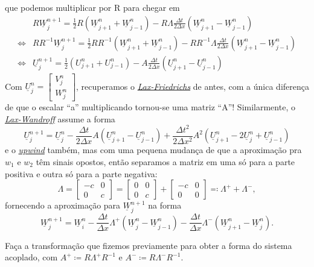 \documentclass[../differential_methods.tex]{subfiles}
\begin{document}
que podemos multiplicar por R para chegar em
\begin{align*}
	                    & R\underline{W}_{j}^{n+1} = \frac{1}{2}R(\underline{W}_{j+1}^{n}+\underline{W}_{j-1}^{n})-R\Lambda \frac{\Delta t}{2\Delta x}(\underline{W}_{j+1}^{n}-\underline{W}_{j-1}^{n})                   \\
	\Longleftrightarrow & RR^{-1}\underline{W}_{j}^{n+1} = \frac{1}{2}RR^{-1}(\underline{W}_{j+1}^{n}+\underline{W}_{j-1}^{n})-RR^{-1}\Lambda \frac{\Delta t}{2\Delta x}(\underline{W}_{j+1}^{n}-\underline{W}_{j-1}^{n}) \\
	\Longleftrightarrow & \boxed{\underline{U}_{j}^{n+1} = \frac{1}{2}(U_{j+1}^{n}+U_{j-1}^{n}) - A \frac{\Delta t}{2\Delta x}(\underline{U}_{j+1}^{n} - \underline{U}_{j-1}^{n})}
\end{align*}
Com \(\underline{U}_{j}^{n} = \begin{bmatrix}
	V_{j}^{n} \\
	W_{j}^{n}
\end{bmatrix}\), recuperamos o \hyperlink{lax_friedrichs}{\textit{Lax-Friedrichs}} de antes, com a única diferença de que o escalar ``a'' multiplicando tornou-se uma matriz ``A''! Similarmente, o \hyperlink{lax_wandroff}{\textit{Lax-Wandroff}} assume a forma
\[
	\boxed{\underline{U}_{j}^{n+1} = \underline{U}_{j}^{n} - \frac{\Delta t}{2\Delta x} A (\underline{U}_{j+1}^{n} - \underline{U}_{j-1}^{n}) + \frac{\Delta t^{2}}{2\Delta x^{2}} A^{2}(\underline{U}_{j+1}^{n}-2\underline{U}_{j}^{n}+\underline{U}_{j-1}^{n})}
\]
e o \hyperlink{up_wind}{\textit{upwind}} também, mas com uma pequena mudança de que a aproximação pra \(w_1\) e \(w_2\) têm sinais opostos, então separamos a matriz em uma só para a parte positiva e outra só para a parte negativa:
\[
	\Lambda  = \begin{bmatrix}
		-c & 0 \\
		0  & c
	\end{bmatrix} = \begin{bmatrix}
		0 & 0 \\
		0 & c
	\end{bmatrix} + \begin{bmatrix}
		-c & 0 \\
		0  & 0
	\end{bmatrix} \eqqcolon \Lambda^{+} + \Lambda^{-},
\]
fornecendo a aproximação para \(\underline{W}_{j}^{n+1}\) na forma
\[
	\underline{W}_{j}^{n+1} = \underline{W}_{i}^{n} - \frac{\Delta t}{\Delta x}\Lambda^{+}(\underline{W}_{j}^{n} - \underline{W}_{j-1}^{n}) - \frac{\Delta t}{\Delta x}\Lambda^{-}(\underline{W}_{j+1}^{n} - \underline{W}_{j}^{n}).
\]
\begin{exr}
	Faça a transformação que fizemos previamente para obter a forma do sistema acoplado, com \(A^{+} \coloneqq R\Lambda^{+}R^{-1}\) e \(A^{-}\coloneqq R\Lambda ^{-}R^{-1}\).
\end{exr}
\end{document}
